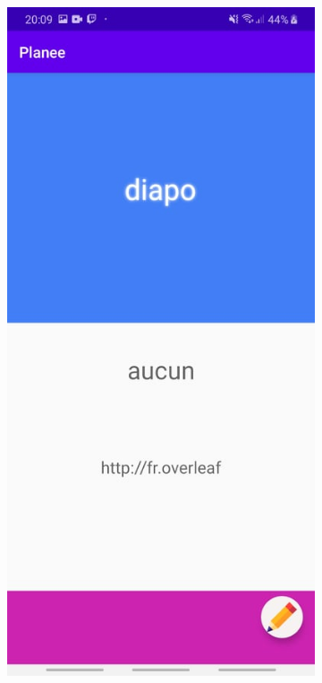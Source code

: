 \documentclass[12pt,a4paper]{report}
\begin{document}
\begin{flushleft}
\begin{figure}[!h]
\begin{subfigure}[b]{0.3\textwidth}
        \includegraphics[width=\textwidth]{Tasks}
    \end{subfigure}

\end{figure}
\end{flushleft}
\end{document}
